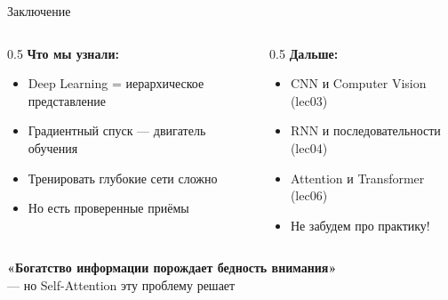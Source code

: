 \documentclass[aspectratio=169, 9pt]{beamer}
\begin{document}
\begin{frame}{Заключение}
  \begin{columns}[T]
    \begin{column}{0.5\textwidth}
      \textbf{Что мы узнали:}
      \begin{itemize}
        \item Deep Learning = иерархическое представление
        \item Градиентный спуск — двигатель обучения
        \item Тренировать глубокие сети сложно
        \item Но есть проверенные приёмы
      \end{itemize}
    \end{column}
    \begin{column}{0.5\textwidth}
      \textbf{Дальше:}
      \begin{itemize}
        \item CNN и Computer Vision (lec03)
        \item RNN и последовательности (lec04)
        \item Attention и Transformer (lec06)
        \item Не забудем про практику!
      \end{itemize}
    \end{column}
  \end{columns}
  
  \vspace{1em}
  \begin{center}
    \textcolor{blue!70!black}{\textbf{«Богатство информации порождает бедность внимания»}} \\
    \tiny{— но Self-Attention эту проблему решает}
  \end{center}
\end{frame}
\end{document}
